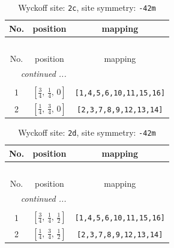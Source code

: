 \documentclass[fleqn,8pt]{jsarticle}
\begin{document}
\renewcommand{\arraystretch}{1.2}
\begin{longtable}{ccc}
\caption{Wyckoff site: {\tt 2c}, site symmetry: {\tt -42m}}
 \\
 \hline \hline
No. & position & mapping \\ \hline \endfirsthead

\multicolumn{2}{l}{\tablename\ \thetable{}} \\
 \hline \hline
No. & position & mapping \\ \hline \endhead

 \hline \hline
\multicolumn{2}{r}{\footnotesize\it continued ...} \\ \endfoot

 \hline \hline
\multicolumn{2}{r}{} \\ \endlastfoot

1 & $\left[ \frac{3}{4},\, \frac{1}{4},\, 0 \right]$ & {\tt [1,4,5,6,10,11,15,16]} \\ \hline
2 & $\left[ \frac{1}{4},\, \frac{3}{4},\, 0 \right]$ & {\tt [2,3,7,8,9,12,13,14]} \\
\end{longtable}
\renewcommand{\arraystretch}{1.2}
\begin{longtable}{ccc}
\caption{Wyckoff site: {\tt 2d}, site symmetry: {\tt -42m}}
 \\
 \hline \hline
No. & position & mapping \\ \hline \endfirsthead

\multicolumn{2}{l}{\tablename\ \thetable{}} \\
 \hline \hline
No. & position & mapping \\ \hline \endhead

 \hline \hline
\multicolumn{2}{r}{\footnotesize\it continued ...} \\ \endfoot

 \hline \hline
\multicolumn{2}{r}{} \\ \endlastfoot

1 & $\left[ \frac{3}{4},\, \frac{1}{4},\, \frac{1}{2} \right]$ & {\tt [1,4,5,6,10,11,15,16]} \\ \hline
2 & $\left[ \frac{1}{4},\, \frac{3}{4},\, \frac{1}{2} \right]$ & {\tt [2,3,7,8,9,12,13,14]} \\
\end{longtable}
\renewcommand{\arraystretch}{1.2}
\end{document}
